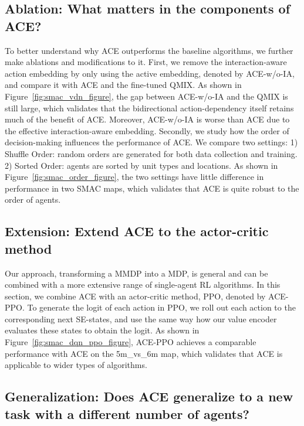 \documentclass[letterpaper]{article} \usepackage{aaai23}  \usepackage{times}  \usepackage{helvet}  \usepackage{courier}  \usepackage[hyphens]{url}  \usepackage{graphicx} \urlstyle{rm} \def\UrlFont{\rm}  \usepackage{natbib}  \usepackage{caption} \frenchspacing  \setlength{\pdfpagewidth}{8.5in} \setlength{\pdfpageheight}{11in} \usepackage{algorithm}
\begin{document}
\vspace{1ex}
\subsection{\textbf{Ablation:} What matters in the components of ACE?}
\vspace{-1ex}
To better understand why ACE outperforms the baseline algorithms, we further make ablations and modifications to it. First, we remove the interaction-aware action embedding by only using the active embedding, denoted by ACE-w/o-IA, and compare it with ACE and the fine-tuned QMIX. As shown in Figure~\ref{fig:smac_vdn_figure}, the gap between ACE-w/o-IA and the QMIX is still large, which validates that the bidirectional action-dependency itself retains much of the benefit of ACE. Moreover, ACE-w/o-IA is worse than ACE due to the effective interaction-aware embedding. Secondly, we study how the order of decision-making influences the performance of ACE. We compare two settings: 1) Shuffle Order: random orders are generated for both data collection and training. 2) Sorted Order: agents are sorted by unit types and locations. As shown in Figure~\ref{fig:smac_order_figure}, the two settings have little difference in performance in two SMAC maps, which validates that ACE is quite robust to the order of agents.
\vspace{-1ex}
\subsection{\textbf{Extension:} Extend ACE to the actor-critic method}
\vspace{-1ex}
Our approach, transforming a MMDP into a MDP, is general and can be combined with a more extensive range of single-agent RL algorithms. In this section, we combine ACE with an actor-critic method, PPO, denoted by ACE-PPO. To generate the logit of each action in PPO, we roll out each action to the corresponding next SE-states, and use the same way how our value encoder evaluates these states to obtain the logit. 
As shown in Figure~\ref{fig:smac_dqn_ppo_figure}, ACE-PPO achieves a comparable performance with ACE on the 5m\_vs\_6m map, which validates that ACE is applicable to wider types of algorithms.

\vspace{-1ex}
\subsection{\textbf{Generalization:} Does ACE generalize to a new task with a different number of agents?}
\vspace{-1ex}
\end{document}
